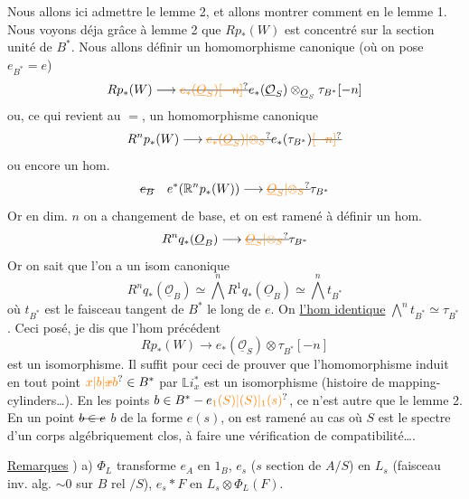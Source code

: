 Nous allons ici admettre le lemme 2, et allons montrer comment en   le lemme 1. Nous voyons déja grâce à lemme 2 que $Rp_*(W)$ est concentré sur la section unité de $B^*$. Nous allons définir un homomorphisme canonique (où on pose $e_{B^*}=e$)
\[
Rp_*(W)\longrightarrow\deleted{\unsure{e_*(\underline O_S)[-n]}}e_*(\underline{\mathcal O}_S)\otimes_{\underline O_S}\tau_{B^*}[-n]
\]
ou, ce qui revient au $=$,  un homomorphisme canonique
\[
R^np_*(W)\longrightarrow\deleted{\unsure{e_*(\underline O_S)|\otimes_S}}e_*(\tau_{B^*})\deleted{\unsure{[-n]}}
\]
ou encore un hom.
\[
\deleted{e_{B}}\quad e^*(\mathbb{R}^n p_*(W))\longrightarrow\deleted{\unsure{\underline O_S|\otimes_S}}\tau_{B^*}
\]
Or en dim. $n$ on a  changement de base, et  on est ramené à définir un hom.
\[
R^n q_*(\underline O_B)\longrightarrow\deleted{\unsure{\underline O_S|\otimes_S}}\tau_{B^*}
\]
Or on sait que l'on a un isom canonique
\[
R^nq_*(\underline{\mathcal O}_B)\simeq\textstyle\bigwedge^{n}R^1q_*(\underline O_B)\simeq\bigwedge^{n}t_{B^*}
\]
où $t_{B^*}$ est le faisceau tangent de $B^*$ le long de $e$. On   \uline{l'hom identique} $\bigwedge^n t_{B^*}\simeq\tau_{B^*}$.
Ceci posé, je dis que l'hom précédent
\[
Rp_*(W)\longrightarrow e_*(\underline{\mathcal O}_S)\otimes\tau_{B^*}[-n]
\]
est un isomorphisme. Il suffit pour ceci de prouver que l'homomorphisme induit  en tout point $\unsure{x|b|\deleted{x}b}\in B^*$ par $\mathbb{L} i_x^*$ est un isomorphisme (histoire de mapping-cylinders\ldots). En les points $b\in B^*-e\unsure{_1(S)|(S)|_1(s)}$, ce n'est autre que le lemme 2. En un point $\deleted{b\in e}$ $b$ de la forme $e(s)$, on est ramené au cas où $S$ est le spectre d'un corps algébriquement clos, à faire une vérification de compatibilité\ldots.

\uline{Remarques} ) a) $\Phi_L$ transforme $e_A$ en $1_B$, $e_s$ ($s$ section de $A/S$) en $L_s$ (faisceau inv. alg. $\sim0$ sur $B$ rel $/S$),  $e_s*F$ en $L_s\otimes\Phi_L(F)$.

